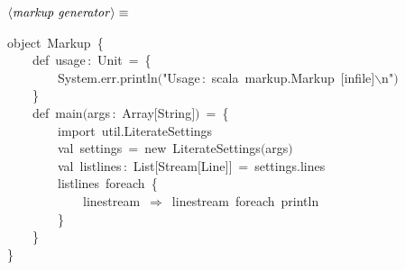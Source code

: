 \documentclass[a4paper,12pt]{article}
\begin{document}
$\left<\mbox{\emph{markup generator}}\right>\equiv$
\begin{program}{\vem object}~Markup~{\small\{}
\\[0.5em]~~~~{\vem def}~usage\,{\rm :}~Unit~=~{\small\{}
\\~~~~~~~~System.err.println$($"Usage\,{\rm :}~scala~markup.Markup~$[$infile$]$$\backslash$n"$)$
\\~~~~{\small\}}
\\[0.5em]~~~~{\vem def}~main$($args\,{\rm :}~Array$[$String$]$$)$~=~{\small\{}
\\~~~~~~~~{\vem import}~util.LiterateSettings
\\[0.5em]~~~~~~~~{\vem val}~settings~=~{\vem new}~LiterateSettings$($args$)$
\\[0.5em]~~~~~~~~{\vem val}~listlines\,{\rm :}~List$[$Stream$[$Line$]$$]$~=~settings.lines
\\~~~~~~~~listlines~foreach~{\small\{}
\\~~~~~~~~~~~~linestream~$\Rightarrow$~linestream~foreach~println
\\~~~~~~~~{\small\}}
\\~~~~{\small\}}
\\{\small\}}
\end{program}
\end{document}
